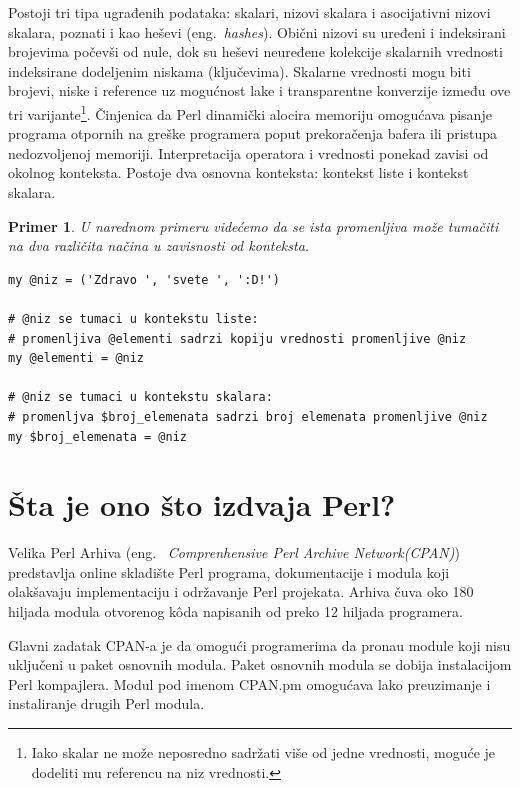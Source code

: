\documentclass[a4paper]{article}
\newtheorem{primer}{Primer}[section]
\begin{document}
Postoji tri tipa ugrađenih podataka: skalari, nizovi skalara i asocijativni nizovi skalara, poznati i kao heševi (eng.~{\em hashes}). Obični nizovi su uređeni i indeksirani brojevima počevši od nule, dok su heševi neuređene kolekcije skalarnih vrednosti indeksirane dodeljenim niskama (ključevima). Skalarne vrednosti mogu biti brojevi, niske i reference uz mogućnost lake i transparentne konverzije između ove tri varijante\footnote{Iako skalar ne može neposredno sadržati više od jedne vrednosti, moguće je dodeliti mu referencu na niz vrednosti.}. Činjenica da Perl dinamički alocira memoriju omogućava pisanje programa otpornih na greške programera poput prekoračenja bafera ili pristupa nedozvoljenoj memoriji. Interpretacija operatora i vrednosti ponekad zavisi od okolnog konteksta. Postoje dva osnovna konteksta: kontekst liste i kontekst skalara\cite{perldoc}.
\begin{primer}
U narednom primeru videćemo da se ista promenljiva može tumačiti na dva različita načina u zavisnosti od konteksta. 
\end{primer}
\begin{lstlisting}[label = kontekst]
my @niz = ('Zdravo ', 'svete ', ':D!')    

# @niz se tumaci u kontekstu liste:
# promenljiva @elementi sadrzi kopiju vrednosti promenljive @niz
my @elementi = @niz        

# @niz se tumaci u kontekstu skalara:
# promenljva $broj_elemenata sadrzi broj elemenata promenljive @niz
my $broj_elemenata = @niz
\end{lstlisting} 

\section{\v Sta je ono što izdvaja Perl?}

Velika Perl Arhiva\cite{cpan} (eng. ~{\em Comprenhensive Perl Archive Network(CPAN)}) 
 predstavlja online skladište Perl programa, dokumentacije i modula koji olakšavaju implementaciju i održavanje Perl projekata. Arhiva čuva oko 180 hiljada modula otvorenog k\^{o}da napisanih od preko 12 hiljada 
 programera.

Glavni zadatak CPAN-a je da omogu\'ci programerima da prona\dj{}u module koji nisu uklju\v ceni u paket osnovnih modula. Paket osnovnih modula se dobija instalacijom Perl kompajlera. %
Modul pod imenom CPAN.pm omogućava lako preuzimanje i instaliranje drugih Perl modula. 
\end{document}
